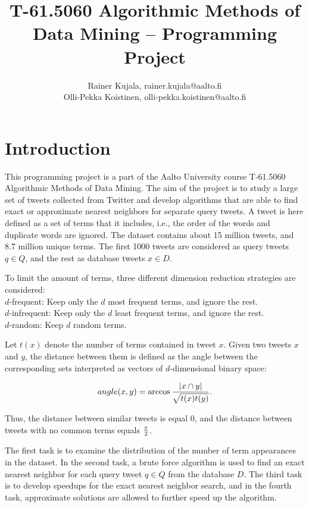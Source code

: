 \documentclass{article}
\begin{document}
\title{T-61.5060 Algorithmic Methods of Data Mining -- Programming Project}
\author{Rainer Kujala, rainer.kujala@aalto.fi \\ Olli-Pekka Koistinen, olli-pekka.koistinen@aalto.fi}

\maketitle

\section*{Introduction}

This programming project is a part of the Aalto University course T-61.5060 Algorithmic Methods of Data Mining.
The aim of the project is to study a large set of tweets collected from Twitter and develop algorithms that
are able to find exact or approximate nearest neighbors for separate query tweets.
A tweet is here defined as a set of terms that it includes, i.e., the order of the words and duplicate words are ignored.
The dataset contains about 15 million tweets, and 8.7 million unique terms.
The first 1000 tweets are considered as query tweets $q \in Q$, and the rest as database tweets $x \in D$.

To limit the amount of terms, three different dimension reduction strategies are considered:\\
$d$-frequent: Keep only the $d$ most frequent terms, and ignore the rest.\\
$d$-infrequent: Keep only the $d$ least frequent terms, and ignore the rest.\\
$d$-random: Keep $d$ random terms.

Let $t(x)$ denote the number of terms contained in tweet $x$. Given two tweets $x$ and $y$, the distance between
them is defined as the angle between the corresponding sets interpreted as vectors of $d$-dimensional binary space:

\begin{equation}
angle(x,y) = \arccos{{|x \cap y|}\over \sqrt{t(x)t(y)}}.
\label{eq:angle}
\end{equation}

Thus, the distance between similar tweets is equal 0, and the distance between tweets with no common terms equals $\pi \over 2$.

The first task is to examine the distribution of the number of term appearances in the dataset.
In the second task, a brute force algorithm is used to find an exact nearest neighbor for each query tweet $q \in Q$ from the database $D$.
The third task is to develop speedups for the exact nearest neighbor search,
and in the fourth task, approximate solutions are allowed to further speed up the algorithm.
\end{document}
